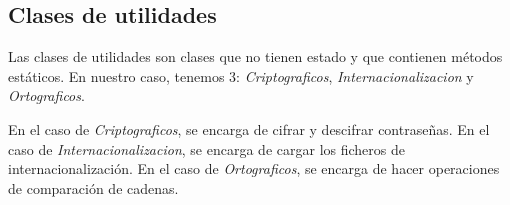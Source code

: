\subsection{Clases de utilidades}\label{subsec:clases_de_utilidades}
Las clases de utilidades son clases que no tienen estado y que contienen métodos estáticos.
En nuestro caso, tenemos 3: \textit{Criptograficos}, \textit{Internacionalizacion} y \textit{Ortograficos}.

En el caso de \textit{Criptograficos}, se encarga de cifrar y descifrar contraseñas.
En el caso de \textit{Internacionalizacion}, se encarga de cargar los ficheros de internacionalización.
En el caso de \textit{Ortograficos}, se encarga de hacer operaciones de comparación de cadenas.

